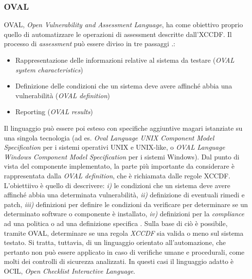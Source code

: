 \documentclass[../main.tex]{subfiles}
\begin{document}
\subsubsection{OVAL}
OVAL, \textit{Open Vulnerability and Assessment Language}, ha come obiettivo proprio quello di automatizzare le operazioni di assessment descritte dall'XCCDF.
Il processo di \textit{assessment} può essere diviso in tre passaggi \cite{nist800126}.:
\begin{itemize}
    \item Rappresentazione delle informazioni relative al sistema da testare (\textit{OVAL system characteristics})
    \item Definizione delle condizioni che un sistema deve avere affinché abbia una vulnerabilità (\textit{OVAL definition})
    \item Reporting (\textit{OVAL results})
\end{itemize}
Il linguaggio può essere poi esteso con specifiche aggiuntive magari istanziate su una singola tecnologia (ad es. \textit{Oval Language UNIX Component Model Specification} per i sistemi operativi UNIX e UNIX-like, o \textit{OVAL Language Windows Component Model Specification} per i sistemi Windows).
Dal punto di vista del componente implementato, la parte più importante da considerare è rappresentata dalla \textit{OVAL definition}, che è richiamata dalle regole XCCDF.
L'obiettiivo è quello di descrivere: \textit{i)} le condizioni che un sistema deve avere affinché abbia una determinata vulnerabilità, \textit{ii)} definizione di eventuali rimedi e patch, \textit{iii)} definizioni per definire le condizioni da verificare per determinare se un determinato software o componente è installato, \textit{iv)} definizioni per la \textit{compliance} ad una politica o ad una definizione specifica \cite{nist800126}. Sulla base di ciò è possibile, tramite OVAL, determinare se una regola \textit{XCCDF} sia valida o meno sul sistema testato. 
Si tratta, tuttavia, di un linguaggio orientato all'automazione, che pertanto non può essere applicato in caso di verifiche umane e procedurali, come molti dei controlli di sicurezza analizzati.
In questi casi il linguaggio adatto è OCIL, \textit{Open Checklist Interactive Language}.
\end{document}
